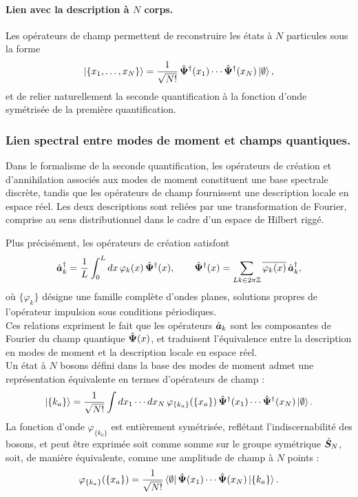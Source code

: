 \paragraph{Lien avec la description à $N$ corps.}
Les opérateurs de champ permettent de reconstruire les états à $N$ particules sous la forme
\begin{eqnarray}
    \ket{\{x_1,\dots,x_N\}}
=
\frac{1}{\sqrt{N!}}\,
\hat{\bm{\Psi}}^\dagger(x_1)\cdots \hat{\bm{\Psi}}^\dagger(x_N)
\ket{\emptyset},
\end{eqnarray}
et de relier naturellement la seconde quantification à la fonction d’onde symétrisée de la première quantification.

\subsubsection{Lien spectral entre modes de moment et champs quantiques.}

Dans le formalisme de la seconde quantification, les opérateurs de création et d’annihilation associés aux modes de moment constituent une base spectrale discrète, tandis que les opérateurs de champ fournissent une description locale en espace réel. Les deux descriptions sont reliées par une transformation de Fourier, comprise au sens distributionnel dans le cadre d’un espace de Hilbert riggé.

Plus précisément, les opérateurs de création satisfont
\begin{eqnarray}\label{chap.1:eq.rapel.etat.second.1}
	\hat{\bm{a}}_k^\dagger
	=
	\frac{1}L\int_0^L dx \, \varphi_k(x)\, \hat{\bm{\Psi}}^\dagger(x),
	\qquad
	\hat{\bm{\Psi}}^\dagger(x)
	=
	\sum_{Lk\in 2 \pi \mathbb Z}  \overline{\varphi_k(x)}\, \hat{\bm{a}}_k^\dagger,
\end{eqnarray}
où $\{\varphi_k\}$ désigne une famille complète d’ondes planes, solutions propres de l’opérateur impulsion sous conditions périodiques.\\

Ces relations expriment le fait que les opérateurs $\hat{\bm{a}}_k$ sont les composantes de Fourier du champ quantique $\hat{\bm{\Psi}}(x)$, et traduisent l’équivalence entre la description en modes de moment et la description locale en espace réel.\\

Un état à $N$ bosons défini dans la base des modes de moment admet une représentation équivalente en termes d’opérateurs de champ :
\begin{eqnarray}
	\ket{\{k_a\}}
	=
	\frac{1}{\sqrt{N!}}
	\int dx_1 \cdots dx_N\,
	\varphi_{\{k_a\}}(\{x_a\})\,
	\hat{\bm{\Psi}}^\dagger(x_1)\cdots
	\hat{\bm{\Psi}}^\dagger(x_N)\ket{\emptyset}.
\end{eqnarray}
La fonction d’onde $\varphi_{\{k_a\}}$ est entièrement symétrisée, reflétant l’indiscernabilité des bosons, et peut être exprimée soit comme somme sur le groupe symétrique $\hat{\bm{S}}_N$, soit, de manière équivalente, comme une amplitude de champ à $N$ points :
\begin{eqnarray}
	\varphi_{\{k_a\}}(\{x_a\})
	=
	\frac{1}{\sqrt{N!}}
	\bra{\emptyset}
	\hat{\bm{\Psi}}(x_1)\cdots \hat{\bm{\Psi}}(x_N)
	\ket{\{k_a\}}.
\end{eqnarray}


